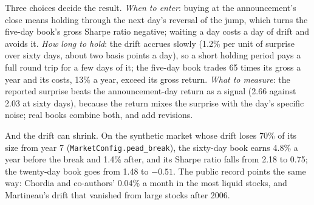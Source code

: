 Three choices decide the result. \emph{When to enter}: buying at the announcement's close means holding through the next day's reversal of the jump, which
turns the five-day book's gross Sharpe ratio negative; waiting a day costs a day of drift and avoids it. \emph{How long to hold}: the drift accrues slowly
(1.2\% per unit of surprise over sixty days, about two basis points a day), so a short holding period pays a full round trip for a few days of it; the
five-day book trades 65 times its gross a year and its costs, 13\% a year, exceed its gross return. \emph{What to measure}: the reported surprise beats the
announcement-day return as a signal (2.66 against 2.03 at sixty days), because the return mixes the surprise with the day's specific noise; real books
combine both, and add revisions.

And the drift can shrink. On the synthetic market whose drift loses 70\% of its size from year 7 (\texttt{MarketConfig.pead\_break}), the sixty-day book
earns 4.8\% a year before the break and 1.4\% after, and its Sharpe ratio falls from 2.18 to 0.75; the twenty-day book goes from 1.48 to $-0.51$. The public
record points the same way: Chordia and co-authors' 0.04\% a month in the most liquid stocks, and Martineau's drift that vanished from large stocks after
2006.

\begin{omfigure}

\label{fig:s1:earnings:holds}
\end{omfigure}


